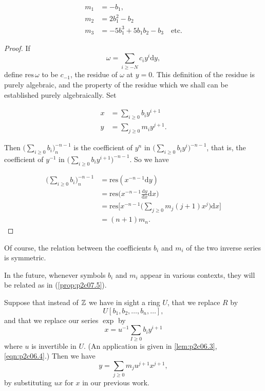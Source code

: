 \documentclass[../main]{subfiles}
\begin{document}
\begin{examples}
\begin{align*}
m_1 & = -b_1, \\ m_2 & = 2 b_1^2 - b_2 \\ m_3 & = -5b_1^3 + 5b_1b_2 - b_3 \quad \text{etc.}
\end{align*}
\end{examples}

\begin{proof}
If \[\omega = \sum_{i \ge -N} c_i y^i \mathrm d y,\] define $\mathrm{res} \, \omega$ to be $c_{-1}$, the residue of $\omega$ at $y=0$. This definition of the residue is purely algebraic, and the property of the residue which we shall can be established purely algebraically. Set

\begin{align*}
x & = \sum_{i \ge 0} b_i y^{i + 1} \\ y & = \sum_{j \ge 0} m_i y^{j + 1}.
\end{align*}

Then $\displaystyle \bigg(\sum_{i \ge 0} b_i\bigg)_n^{-n - 1}$ is the coefficient of $y^n$ in $\displaystyle \bigg(\sum_{i \ge 0} b_i y^i\bigg)^{-n - 1}$, that is, the coefficient of $y^{-1}$ in $\displaystyle \bigg(\sum_{i \ge 0} b_i y^{i + 1}\bigg)^{-n - 1}$. So we have 

\begin{align*}
\bigg(\sum_{i \ge 0} b_i\bigg)_n^{-n - 1} & = \mathrm{res}(x^{-n - 1} \mathrm dy) \\ & = \mathrm{res} \bigg(x^{-n - 1} \frac {\mathrm dy} {\mathrm dx} \mathrm dx\bigg) \\ & = \mathrm{res} \bigg[x^{-n - 1} \bigg(\sum_{j \ge 0} m_j (j + 1) x^j\bigg) \mathrm dx\bigg] \\ & = (n + 1)m_n.
\end{align*}
\end{proof}

Of course, the relation between the coefficients $b_i$ and $m_i$ of the two inverse series is symmetric.

In the future, whenever symbols $b_i$ and $m_i$ appear in various contexts, they will be related as in (\ref{prop:p2c07.5}).

\begin{customremark}{7.6}\label{rem:p2c07.6}
Suppose that instead of $\mathbb{Z}$ we have in sight a ring $U$, that we replace $R$ by \[U[b_1, b_2, \ldots, b_n, \ldots],\] and that we replace our series $\exp$ by \[x = u^{-1} \sum_{I \ge 0} b_i y^{i + 1}\] where $u$ is invertible in $U$. (An application is given in \eqref{lem:p2c06.3}, \eqref{eqn:p2c06.4}.) Then we have \[y = \sum_{j \ge 0} m_j u^{j + 1} x^{j + 1},\] by substituting $u x$ for $x$ in our previous work.
\end{customremark}
\end{document}
